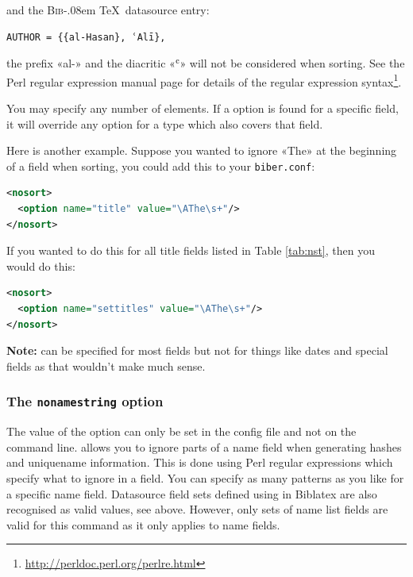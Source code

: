 \documentclass{ltxdockit}
\def\BibTeX{\textsc{Bib}\kern-.08em \TeX}
\newcommand*{\biblatex}{Biblatex\xspace}
\begin{document}
\noindent and the \BibTeX\ datasource entry:

\begin{verbatim}
AUTHOR = {{al-Hasan}, ʿAlī},
\end{verbatim}

\noindent the prefix «al-» and the diacritic «ʿ» will not be considered
when sorting. See the Perl regular expression manual page for
details of the regular expression syntax\footnote{\url{http://perldoc.perl.org/perlre.html}}.

You may specify any number of  elements. If a
 option is found for a specific field, it will override
any option for a type which also covers that field.

Here is another example. Suppose you wanted to ignore «The» at the
beginning of a  field when sorting, you could add this to your
\verb+biber.conf+:

\begin{lstlisting}[language=xml]
<nosort>
  <option name="title" value="\AThe\s+"/>
</nosort>
\end{lstlisting}

\noindent If you wanted to do this for all title fields listed in Table
\ref{tab:nst}, then you would do this:

\begin{lstlisting}[language=xml]
<nosort>
  <option name="settitles" value="\AThe\s+"/>
</nosort>
\end{lstlisting}

\noindent \textbf{Note:}  can be specified for most fields but
not for things like dates and special fields as that wouldn't make much sense.
\bigskip
\subsubsection{The \texttt{nonamestring} option}\label{nonamestring}

The value of the  option can only be set in the config
file and not on the command line.  allows you to ignore
parts of a name field when generating hashes and uniquename information.
This is done using Perl regular expressions which specify what to ignore in
a field. You can specify as many patterns as you like for a specific name
field. Datasource field sets defined using  in
\biblatex are also recognised as valid values, see 
above. However, only sets of name list fields are valid for this command as
it only applies to name fields.
\end{document}
